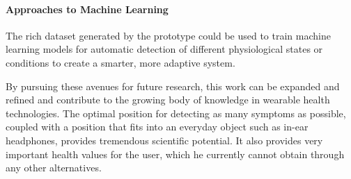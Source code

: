 \paragraph{Approaches to Machine Learning}
The rich dataset generated by the prototype could be used to train machine learning models for automatic detection of different physiological states or conditions to create a smarter, more adaptive system.

By pursuing these avenues for future research, this work can be expanded and refined and contribute to the growing body of knowledge in wearable health technologies.
The optimal position for detecting as many symptoms as possible, coupled with a position that fits into an everyday object such as in-ear headphones, provides tremendous scientific potential.
It also provides very important health values for the user, which he currently cannot obtain through any other alternatives.